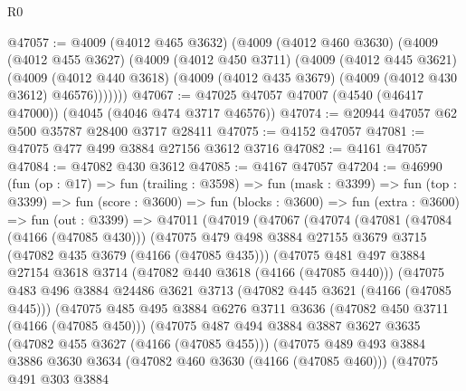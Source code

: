 \begin{lexlean}{R0}
\begin{coremodule}
@47057 := @4009
    (@4012 @465 @3632)
    (@4009
      (@4012 @460 @3630)
      (@4009
        (@4012 @455 @3627)
        (@4009
          (@4012 @450 @3711)
          (@4009
            (@4012 @445 @3621)
            (@4009
              (@4012 @440 @3618)
              (@4009 (@4012 @435 @3679) (@4009 (@4012 @430 @3612) @46576)))))))
@47067 := @47025 @47057 @47007 (@4540 (@46417 @47000)) (@4045 (@4046 @474 @3717 @46576))
@47074 := @20944 @47057 @62 @500 @35787 @28400 @3717 @28411
@47075 := @4152 @47057
@47081 := @47075 @477 @499 @3884 @27156 @3612 @3716
@47082 := @4161 @47057
@47084 := @47082 @430 @3612
@47085 := @4167 @47057
@47204 := @46990
    (fun (op : @17) =>
    fun (trailing : @3598) =>
    fun (mask : @3399) =>
    fun (top : @3399) =>
    fun (score : @3600) =>
    fun (blocks : @3600) =>
    fun (extra : @3600) =>
    fun (out : @3399) =>
    @47011
      (@47019
        (@47067
          (@47074
            (@47081
              (@47084 (@4166 (@47085 @430)))
              (@47075
                @479
                @498
                @3884
                @27155
                @3679
                @3715
                (@47082 @435 @3679 (@4166 (@47085 @435)))
                (@47075
                  @481
                  @497
                  @3884
                  @27154
                  @3618
                  @3714
                  (@47082 @440 @3618 (@4166 (@47085 @440)))
                  (@47075
                    @483
                    @496
                    @3884
                    @24486
                    @3621
                    @3713
                    (@47082 @445 @3621 (@4166 (@47085 @445)))
                    (@47075
                      @485
                      @495
                      @3884
                      @6276
                      @3711
                      @3636
                      (@47082 @450 @3711 (@4166 (@47085 @450)))
                      (@47075
                        @487
                        @494
                        @3884
                        @3887
                        @3627
                        @3635
                        (@47082 @455 @3627 (@4166 (@47085 @455)))
                        (@47075
                          @489
                          @493
                          @3884
                          @3886
                          @3630
                          @3634
                          (@47082 @460 @3630 (@4166 (@47085 @460)))
                          (@47075
                            @491
                            @303
                            @3884

\end{coremodule}
\end{lexlean}
